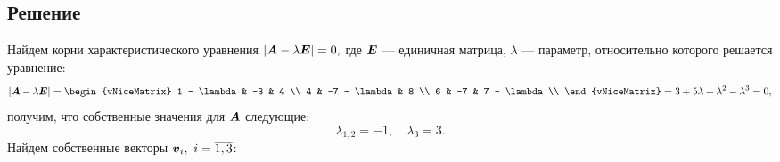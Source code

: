 \documentclass[12pt, a4paper]{article}
\renewcommand{\vec}[1]{\text{\mathversion{bold}${#1}$}}%
\begin{document}
		\subsection*{Решение}	
		Найдем корни характеристического уравнения
		$
			\left| \vec A - \lambda \vec E \right| = 0,
		$
		где $\vec E$ --- единичная матрица, $\lambda$ --- параметр, относительно которого решается уравнение:
		\begin{equation*}
			\left| \vec A - \lambda \vec E \right| = 
			\begin{vNiceMatrix}
				1 - \lambda & -3 & 4 \\
				4 & -7 - \lambda & 8 \\
				6 & -7 & 7 - \lambda \\
			\end{vNiceMatrix} = 3 + 5 \lambda + \lambda^2 - \lambda^3 = 0,
		\end{equation*}
		получим, что собственные значения для $\vec A$ следующие:
		\vspace*{-2.5mm}
		$$
		\lambda_{1,2} = -1, \quad \lambda_3 = 3.
		$$
		Найдем собственные векторы $\vec v_i, \ i = \overline{1, 3}$: 
\end{document}
